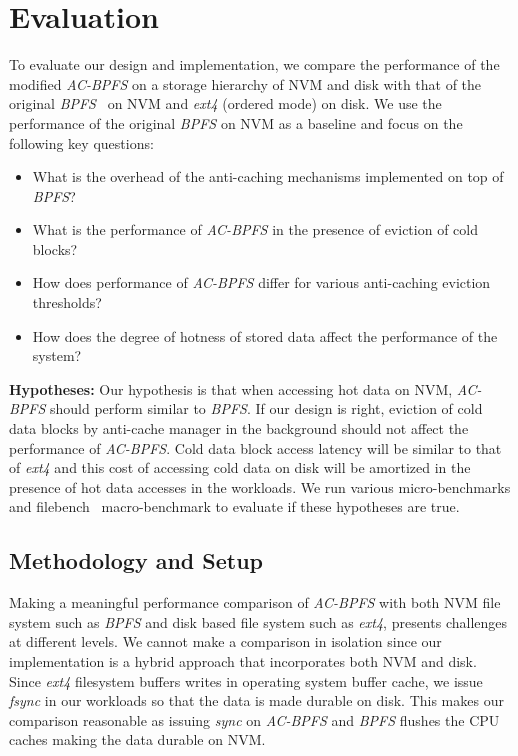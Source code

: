 \section{Evaluation}
To evaluate our design and implementation, we compare the performance of the modified \textit{AC-BPFS} on a storage hierarchy of NVM and disk with that of the original \textit{BPFS}~\cite{c10} on NVM and \textit{ext4} (ordered mode) on disk. We use the performance of the original \textit{BPFS} on NVM as a baseline and focus on the following key questions:

\begin{itemize}
\item What is the overhead of the anti-caching mechanisms implemented on top of \textit{BPFS}? \vspace{-0.1in}
\item What is the performance of \textit{AC-BPFS} in the presence of eviction of cold blocks? \vspace{-0.1in}
\item How does performance of \textit{AC-BPFS} differ for various anti-caching eviction thresholds? \vspace{-0.1in}
\item How does the degree of hotness of stored data affect the performance of the system? \vspace{-0.1in}
\end{itemize}

\textbf{Hypotheses:} Our hypothesis is that when accessing hot data on NVM, \textit{AC-BPFS} should perform similar to \textit{BPFS}. If our design is right, eviction of cold data blocks by anti-cache manager in the background should not affect the performance of \textit{AC-BPFS}. Cold data block access latency will be similar to that of \textit{ext4} and this cost of accessing cold data on disk will be amortized in the presence of hot data accesses in the workloads. We run various micro-benchmarks and filebench~\cite{filebench} macro-benchmark to evaluate if these hypotheses are true.

\subsection{Methodology and Setup}
Making a meaningful performance comparison of \textit{AC-BPFS} with both NVM file system such as \textit{BPFS} and disk based file system such as \textit{ext4}, presents challenges at different levels. We cannot make a comparison in isolation since our implementation is a hybrid approach that incorporates both NVM and disk. Since \textit{ext4} filesystem buffers writes in operating system buffer cache, we issue \textit{fsync} in our workloads so that the data is made durable on disk. This makes our comparison reasonable as issuing \textit{sync} on \textit{AC-BPFS} and \textit{BPFS} flushes the CPU caches making the data durable on NVM.

